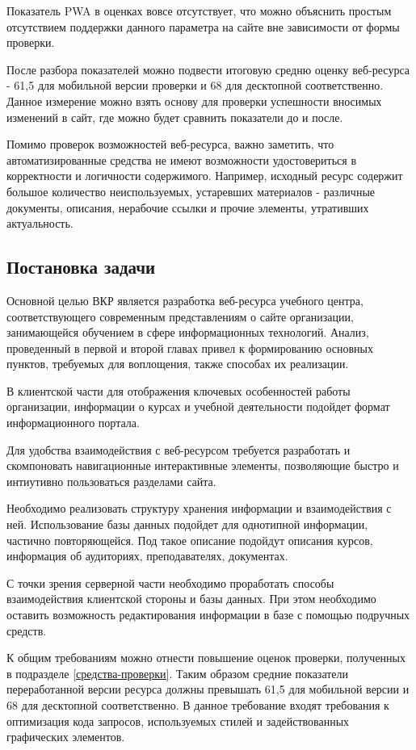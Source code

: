 Показатель PWA в оценках вовсе отсутствует, что можно объяснить простым отсутствием поддержки данного параметра на сайте вне зависимости от формы проверки.

После разбора показателей можно подвести итоговую средню оценку веб-ресурса - 61,5 для мобильной версии проверки и 68 для десктопной соответственно.
Данное измерение можно взять основу для проверки успешности вносимых изменений в сайт, где можно будет сравнить показатели до и после.

Помимо проверок возможностей веб-ресурса, важно заметить, что автоматизированные средства не имеют возможности удостовериться в корректности и логичности содержимого.
Например, исходный ресурс содержит большое количество неиспользуемых, устаревших материалов - различные документы, описания, нерабочие ссылки и прочие элементы, утративших актуальность.

\subsection{Постановка задачи}

Основной целью ВКР является разработка веб-ресурса учебного центра, соответствующего современным представлениям о сайте организации, занимающейся обучением в сфере информационных технологий.
Анализ, проведенный в первой и второй главах привел к формированию основных пунктов, требуемых для воплощения, также способах их реализации.

В клиентской части для отображения ключевых особенностей работы организации, информации о курсах и учебной деятельности подойдет формат информационного портала.

Для удобства взаимодействия с веб-ресурсом требуется разработать и скомпоновать навигационные интерактивные элементы, позволяющие быстро и интиутивно пользоваться разделами сайта.

Необходимо реализовать структуру хранения информации и взаимодействия с ней.
Использование базы данных подойдет для однотипной информации, частично повторяющейся.
Под такое описание подойдут описания курсов, информация об аудиториях, преподавателях, документах.

С точки зрения серверной части необходимо проработать способы взаимодействия клиентской стороны и базы данных.
При этом необходимо оставить возможность редактирования информации в базе с помощью подручных средств.

К общим требованиям можно отнести повышение оценок проверки, полученных в подразделе \ref{средства-проверки}.
Таким образом средние показатели переработанной версии ресурса должны превышать  61,5 для мобильной версии и 68 для десктопной соответственно.
В данное требование входят требования к оптимизация кода запросов, используемых стилей и задействованных графических элементов.

\clearpage
